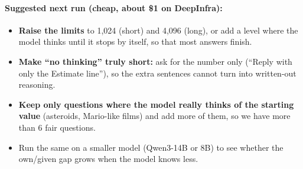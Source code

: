 \documentclass[11pt,a4paper]{article}
\begin{document}
\paragraph{Suggested next run (cheap, about \$1 on DeepInfra):}
\begin{itemize}
  \item \textbf{Raise the limits} to 1,024 (short) and 4,096 (long), or add a level where the model thinks until it stops by itself, so that most answers finish.
  \item \textbf{Make ``no thinking'' truly short:} ask for the number only (``Reply with only the Estimate line''), so the extra sentences cannot turn into written-out reasoning.
  \item \textbf{Keep only questions where the model really thinks of the starting value} (asteroids, Mario-like films) and add more of them, so we have more than 6 fair questions.
  \item Run the same on a smaller model (Qwen3-14B or 8B) to see whether the own/given gap grows when the model knows less.
\end{itemize}
\end{document}
